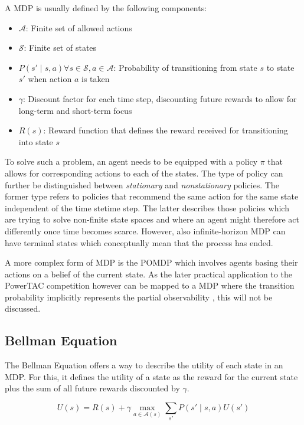 A \ac {MDP} is usually defined by the following components:

\begin{itemize}
	\item $\mathcal{A}$: Finite set of allowed actions  
	\item $\mathcal{S}$: Finite set of states
	\item $P(s' \mid s,a) \forall s \in \mathcal{S}, a \in \mathcal{A}$: Probability of transitioning from state
	$s$ to state $s'$ when action $a$ is taken
	\item $\gamma$: Discount factor for each time step, discounting future rewards to allow for long-term and
		short-term focus
	\item $R(s)$: Reward function that defines the reward received for transitioning into state $s$
\end{itemize}

To solve such a problem, an agent needs to be equipped with a policy $\pi$ that allows for corresponding actions to each
of the states. The type of policy can further be distinguished between \emph{stationary} and \emph{nonstationary}
policies. The former type refers to policies that recommend the same action for the same state independent of the
time stetime step. The latter describes those policies which are trying to solve non-finite state spaces and where an
agent might therefore act differently once time becomes scarce. However, also infinite-horizon \ac {MDP} can have
terminal states which conceptually mean that the process has ended.

A more complex form of \ac {MDP} is the \ac {POMDP} which involves agents basing their actions on a belief of the
current state. As the later practical application to the \ac {PowerTAC} competition however can be mapped to a \ac {MDP}
where the transition probability implicitly represents the partial observability \citep{tactexurieli2016mdp}, this will not be discussed. 

\subsection{Bellman Equation}%
\label{ssub:bellman_equation}

The Bellman Equation offers a way to describe the utility of each state in an \ac {MDP}. For this, it defines the
utility of a state as the reward for the current state plus the sum of all future rewards discounted by $\gamma$. 

\begin{equation}
U(s) = R(s) + \gamma \max_{a\in\mathcal{A}(s)} \sum_{s'}{P(s' \mid s,a)U(s')}
\end{equation}

